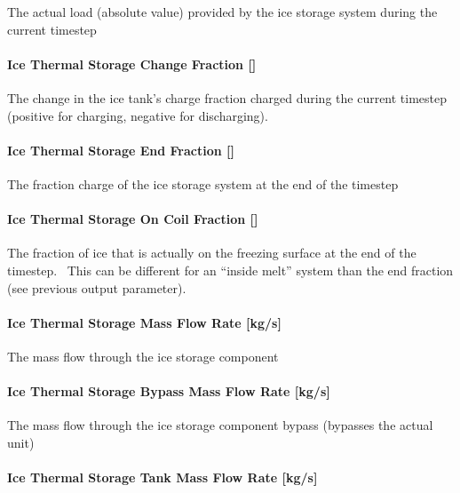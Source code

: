 The actual load (absolute value) provided by the ice storage system during the current timestep

\paragraph{Ice Thermal Storage Change Fraction {[]}}\label{ice-thermal-storage-change-fraction}

The change in the ice tank's charge fraction charged during the current timestep (positive for charging, negative for discharging).

\paragraph{Ice Thermal Storage End Fraction {[]}}\label{ice-thermal-storage-end-fraction-1}

The fraction charge of the ice storage system at the end of the timestep

\paragraph{Ice Thermal Storage On Coil Fraction {[]}}\label{ice-thermal-storage-on-coil-fraction}

The fraction of ice that is actually on the freezing surface at the end of the timestep.~ This can be different for an ``inside melt'' system than the end fraction (see previous output parameter).

\paragraph{Ice Thermal Storage Mass Flow Rate {[}kg/s{]}}\label{ice-thermal-storage-mass-flow-rate-kgs-1}

The mass flow through the ice storage component

\paragraph{Ice Thermal Storage Bypass Mass Flow Rate {[}kg/s{]}}\label{ice-thermal-storage-bypass-mass-flow-rate-kgs}

The mass flow through the ice storage component bypass (bypasses the actual unit)

\paragraph{Ice Thermal Storage Tank Mass Flow Rate {[}kg/s{]}}\label{ice-thermal-storage-tank-mass-flow-rate-kgs}

